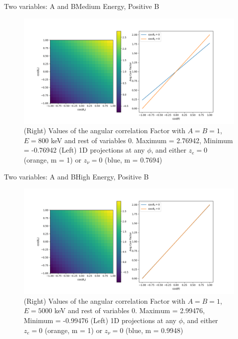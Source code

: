 \documentclass{beamer}
\begin{document}
\begin{frame}{Two variables: A and B}{Medium Energy, Positive B}
	\begin{figure}
		\centering
		\includegraphics[width=0.8\paperwidth]{plots/posA_posB_medE.png}
		\caption{(Right) Values of the angular correlation Factor with $A = B = 1$, $E = 800$ keV and rest of variables 0. Maximum = 2.76942, Minimum = -0.76942 (Left) 1D projections at any $\phi$, and either $z_e = 0$ (orange, m = 1) or $z_\nu = 0$ (blue, m = 0.7694)}	
	\end{figure}
\end{frame}
\begin{frame}{Two variables: A and B}{High Energy, Positive B}
	\begin{figure}
		\centering
		\includegraphics[width=0.8\paperwidth]{plots/posA_posB_hiE.png}
		\caption{(Right) Values of the angular correlation Factor with $A = B = 1$, $E = 5000$ keV and rest of variables 0. Maximum = 2.99476, Minimum = -0.99476 (Left) 1D projections at any $\phi$, and either $z_e = 0$ (orange, m = 1) or $z_\nu = 0$ (blue, m = 0.9948)}	
	\end{figure}
\end{frame}
\end{document}
